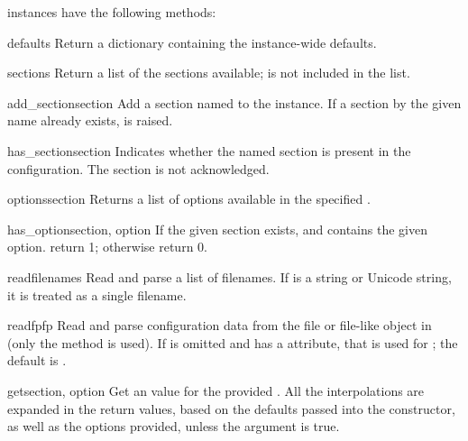  instances have the following methods:

\begin{methoddesc}{defaults}{}
Return a dictionary containing the instance-wide defaults.
\end{methoddesc}

\begin{methoddesc}{sections}{}
Return a list of the sections available;  is not
included in the list.
\end{methoddesc}

\begin{methoddesc}{add_section}{section}
Add a section named  to the instance.  If a section by
the given name already exists,  is
raised.
\end{methoddesc}

\begin{methoddesc}{has_section}{section}
Indicates whether the named section is present in the
configuration. The  section is not acknowledged.
\end{methoddesc}

\begin{methoddesc}{options}{section}
Returns a list of options available in the specified .
\end{methoddesc}

\begin{methoddesc}{has_option}{section, option}
If the given section exists, and contains the given option. return 1;
otherwise return 0.
\end{methoddesc}

\begin{methoddesc}{read}{filenames}
Read and parse a list of filenames.  If  is a string or
Unicode string, it is treated as a single filename.
\end{methoddesc}

\begin{methoddesc}{readfp}{fp}
Read and parse configuration data from the file or file-like object in
 (only the  method is used).  If
 is omitted and  has a  attribute,
that is used for ; the default is .
\end{methoddesc}

\begin{methoddesc}{get}{section, option}
Get an  value for the provided .  All the
\character{\%} interpolations are expanded in the return values, based on
the defaults passed into the constructor, as well as the options
 provided, unless the  argument is true.
\end{methoddesc}


